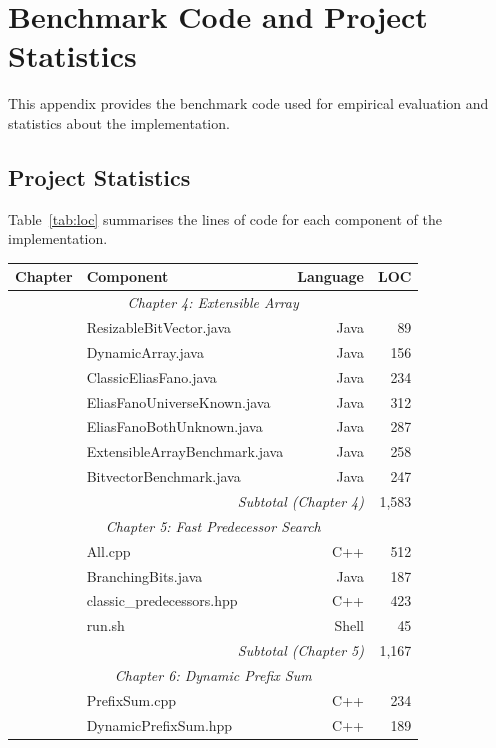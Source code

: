 \chapter{Benchmark Code and Project Statistics}
\label{appendix:benchmarks}

This appendix provides the benchmark code used for empirical evaluation and statistics about the implementation.

\section{Project Statistics}
\label{sec:project-stats}

Table~\ref{tab:loc} summarises the lines of code for each component of the implementation.

\begin{table}[H]
\centering
\begin{tabular}{|l|l|r|r|}
\hline
\textbf{Chapter} & \textbf{Component} & \textbf{Language} & \textbf{LOC} \\
\hline
\multicolumn{4}{|c|}{\textit{Chapter 4: Extensible Array}} \\
\hline
& ResizableBitVector.java & Java & 89 \\
& DynamicArray.java & Java & 156 \\
& ClassicEliasFano.java & Java & 234 \\
& EliasFanoUniverseKnown.java & Java & 312 \\
& EliasFanoBothUnknown.java & Java & 287 \\
& ExtensibleArrayBenchmark.java & Java & 258 \\
& BitvectorBenchmark.java & Java & 247 \\
\hline
\multicolumn{3}{|r|}{\textit{Subtotal (Chapter 4)}} & 1,583 \\
\hline
\multicolumn{4}{|c|}{\textit{Chapter 5: Fast Predecessor Search}} \\
\hline
& All.cpp & C++ & 512 \\
& BranchingBits.java & Java & 187 \\
& classic\_predecessors.hpp & C++ & 423 \\
& run.sh & Shell & 45 \\
\hline
\multicolumn{3}{|r|}{\textit{Subtotal (Chapter 5)}} & 1,167 \\
\hline
\multicolumn{4}{|c|}{\textit{Chapter 6: Dynamic Prefix Sum}} \\
\hline
& PrefixSum.cpp & C++ & 234 \\
& DynamicPrefixSum.hpp & C++ & 189 \\

\end{tabular}
\end{table}
